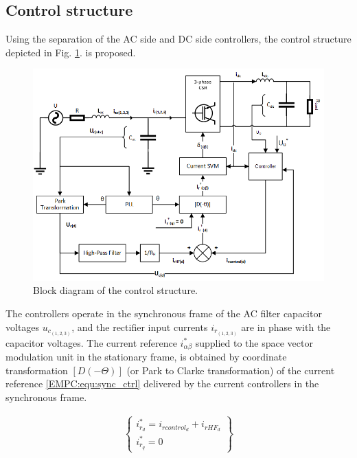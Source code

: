 \subsection{Control structure}\label{EMPC:sec:ControlStruct}

    Using the separation of the AC side and DC side controllers, the control structure depicted in Fig. \ref{EMPC:fig:ControlStruct}. is proposed.

    \begin{figure}[!ht]
        \centering
        \includegraphics[width=\textwidth]{EMPC_PNG_Pics/ControlStructure.png}
        \caption{Block diagram of the control structure.}
        \label{EMPC:fig:ControlStruct}
    \end{figure}

    The controllers operate in the synchronous frame of the AC filter capacitor voltages $u_{c_{(1,2,3)}}$, and the rectifier input currents $i_{r_{(1,2,3)}}$ are in phase with the capacitor voltages.
    The current reference $i^*_{\alpha\beta}$ supplied to the space vector modulation unit in the stationary frame, is obtained by coordinate transformation $[D(-\Theta)]$ (or Park to Clarke transformation) of the current reference \ref{EMPC:equ:sync_ctrl} delivered by the current controllers in the synchronous frame.

    \begin{equation}
        \begin{array}{rcl}
            \begin{Bmatrix}
                i^*_{r_d}=i_{rcontrol_d}+i_{rHF_d}\\
                i^*_{r_q}=0
            \end{Bmatrix}
        \end{array}
        \label{EMPC:equ:sync_ctrl}
    \end{equation}

